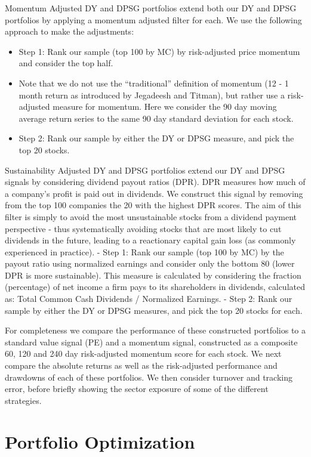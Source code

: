\documentclass[11pt,preprint, authoryear]{elsarticle}
\numberwithin{equation}{section}
\numberwithin{figure}{section}
\numberwithin{table}{section}
\def\tightlist{} %
\begin{document}
Momentum Adjusted DY and DPSG portfolios extend both our DY and DPSG
portfolios by applying a momentum adjusted filter for each. We use the
following approach to make the adjustments:

\begin{itemize}
\tightlist
\item
  Step 1: Rank our sample (top 100 by MC) by risk-adjusted price
  momentum and consider the top half.
\item
  Note that we do not use the ``traditional'' definition of momentum (12
  - 1 month return as introduced by Jegadeesh and Titman), but rather
  use a risk-adjusted measure for momentum. Here we consider the 90 day
  moving average return series to the same 90 day standard deviation for
  each stock.
\item
  Step 2: Rank our sample by either the DY or DPSG measure, and pick the
  top 20 stocks.
\end{itemize}

Sustainability Adjusted DY and DPSG portfolios extend our DY and DPSG
signals by considering dividend payout ratios (DPR). DPR measures how
much of a company's profit is paid out in dividends. We construct this
signal by removing from the top 100 companies the 20 with the highest
DPR scores. The aim of this filter is simply to avoid the most
unsustainable stocks from a dividend payment perspective - thus
systematically avoiding stocks that are most likely to cut dividends in
the future, leading to a reactionary capital gain loss (as commonly
experienced in practice). - Step 1: Rank our sample (top 100 by MC) by
the payout ratio using normalized earnings and consider only the bottom
80 (lower DPR is more sustainable). This measure is calculated by
considering the fraction (percentage) of net income a firm pays to its
shareholders in dividends, calculated as: Total Common Cash Dividends /
Normalized Earnings. - Step 2: Rank our sample by either the DY or DPSG
measures, and pick the top 20 stocks for each.

For completeness we compare the performance of these constructed
portfolios to a standard value signal (PE) and a momentum signal,
constructed as a composite 60, 120 and 240 day risk-adjusted momentum
score for each stock. We next compare the absolute returns as well as
the risk-adjusted performance and drawdowns of each of these portfolios.
We then consider turnover and tracking error, before briefly showing the
sector exposure of some of the different strategies.

\hypertarget{portfolio-optimization}{%
\section{Portfolio Optimization}\label{portfolio-optimization}}
\end{document}
